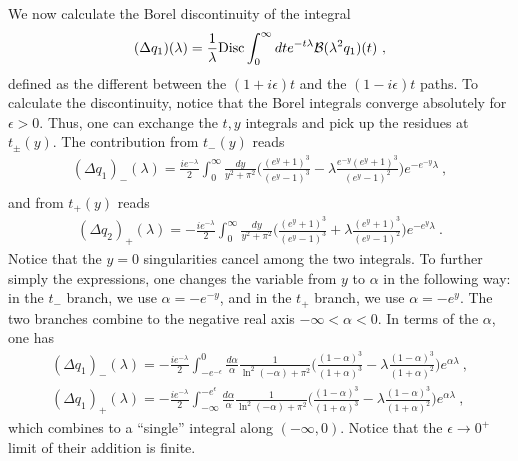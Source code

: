 \documentclass[a4paper,11pt]{article}
\begin{document}
We now calculate the Borel discontinuity of the integral
\begin{align}
(\Delta q_1)(\lambda)=\frac{1}{\lambda}{\rm Disc}\int_{0}^{\infty} dt e^{-t\lambda} {\cal B}(\lambda^2q_1)(t) \ ,
\end{align}
defined as the different between the $(1+i
\epsilon)t$ and the $(1-i\epsilon)t$ paths.  
To calculate the discontinuity, notice that the Borel integrals converge absolutely for $\epsilon>0$. Thus, one can exchange the $t,y$ integrals and pick up the residues at $t_{\pm}(y)$. The contribution from  $t_-(y)$ reads 
\begin{align}
(\Delta q_1)_-(\lambda)=\frac{ie^{-\lambda}}{2}\int_{0}^{\infty}\frac{dy}{y^2+\pi^2}\bigg(\frac{\left(e^y+1\right)^3}{\left(e^y-1\right)^3}-\lambda \frac{e^{-y} \left(e^y+1\right)^3}{\left(e^y-1\right)^2}\bigg)e^{-e^{-y}\lambda} \ , \\
\end{align}
and from $t_+(y)$ reads
\begin{align}
(\Delta q_2)_+(\lambda)=-\frac{ie^{-\lambda}}{2}\int_{0}^{\infty}\frac{dy}{y^2+\pi^2}\bigg(\frac{\left(e^y+1\right)^3}{\left(e^y-1\right)^3}+\lambda\frac{ \left(e^y+1\right)^3}{\left(e^y-1\right)^2}\bigg) e^{-e^{y}\lambda} \ .
\end{align}
Notice that the $y=0$ singularities cancel among the two integrals. To further simply the expressions, one changes the variable from $y$ to $\alpha$ in the following way: in the $t_-$ branch, we use $\alpha=-e^{-y}$, and in the $t_+$ branch, we use $\alpha=-e^{y}$. The two branches combine to the negative real axis $-\infty<\alpha<0$. In terms of the $\alpha$, one has
\begin{align}
(\Delta q_1)_-(\lambda)=-\frac{ie^{-\lambda}}{2}\int_{-e^{-\epsilon}}^{0}\frac{d\alpha}{\alpha}\frac{1}{\ln^2(-\alpha)+\pi^2}\bigg(\frac{(1-\alpha)^3}{(1+\alpha)^3}-\lambda \frac{(1-\alpha)^3}{(1+\alpha)^2}\bigg)e^{\alpha\lambda} \ , \\
(\Delta q_1)_+(\lambda)=-\frac{ie^{-\lambda}}{2}\int_{-\infty}^{-e^{\epsilon}}\frac{d\alpha}{\alpha}\frac{1}{\ln^2(-\alpha)+\pi^2}\bigg(\frac{(1-\alpha)^3}{(1+\alpha)^3}-\lambda \frac{(1-\alpha)^3}{(1+\alpha)^2}\bigg)e^{\alpha\lambda} \ ,
\end{align}
which combines to a ``single'' integral along $(-\infty,0)$. Notice that the $\epsilon \rightarrow 0^+$ limit of their addition is finite. 
\end{document}
